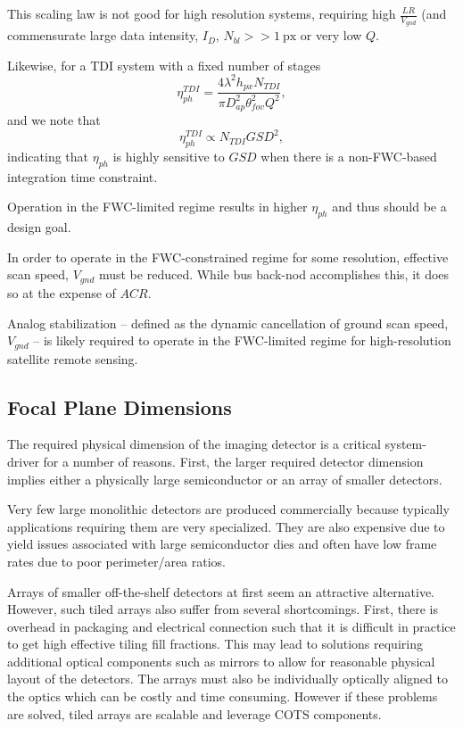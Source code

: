 \documentclass[10pt,journal]{IEEEtran}  %
\begin{document}
This scaling law is not good for high resolution systems, requiring high $\frac{LR}{V_{gnd}}$ (and commensurate large data intensity, $I_{D}$, $N_{bl} >> 1 \: \textrm{px}$ or very low $Q$.

Likewise, for a TDI system with a fixed number of stages
\begin{equation}
    \eta_{ph}^{TDI} = \frac{4\lambda^2 h_{px} N_{TDI}}{\pi D_{ap}^2 \theta_{fov}^2 Q^2},
\end{equation}
and we note that 
\begin{equation}
    \label{eq:eta_ph_tdi_scaling}
    \eta_{ph}^{TDI} \propto N_{TDI} GSD^2,
\end{equation}
indicating that $\eta_{ph}$ is highly sensitive to $GSD$ when there is a non-FWC-based integration time constraint.

\begin{observation}
Operation in the FWC-limited regime results in higher $\eta_{ph}$ and thus should be a design goal.
\end{observation}

In order to operate in the FWC-constrained regime for some resolution, effective scan speed, $V_{gnd}$ must be reduced.  While bus back-nod accomplishes this, it does so at the expense of $ACR$.

\begin{observation}
Analog stabilization -- defined as the dynamic cancellation of ground scan speed, $V_{gnd}$ -- is likely required to operate in the FWC-limited regime for high-resolution satellite remote sensing.
\end{observation}

\subsection{Focal Plane Dimensions}
\label{sec:fp_dimensions}
The required physical dimension of the imaging detector is a critical system-driver for a number of reasons.  First, the larger required detector dimension implies either a physically large semiconductor or an array of smaller detectors.  

Very few large monolithic detectors are produced commercially because typically applications requiring them are very specialized.  They are also expensive due to yield issues associated with large semiconductor dies and often have low frame rates due to poor perimeter/area ratios.

Arrays of smaller off-the-shelf detectors at first seem an attractive alternative.  However, such tiled arrays also suffer from several shortcomings.  First, there is overhead in packaging and electrical connection such that it is difficult in practice to get high effective tiling fill fractions.  This may lead to solutions requiring additional optical components such as mirrors to allow for reasonable physical layout of the detectors.  The arrays must also be individually optically aligned to the optics which can be costly and time consuming. However if these problems are solved, tiled arrays are scalable and leverage COTS components.
\end{document}
